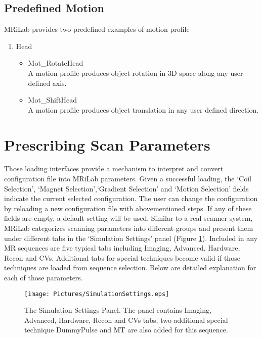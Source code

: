 \documentclass{book}%
\begin{document}
\subsection{Predefined Motion}

MRiLab provides two predefined examples of motion profile

\begin{enumerate}
		\item Head
		\begin{itemize}
			\item Mot\_RotateHead \\
			A motion profile produces object rotation in 3D space along any user defined axis.
			\item Mot\_ShiftHead \\
			A motion profile produces object translation in any user defined direction.
		\end{itemize}
\end{enumerate}

\section{Prescribing Scan Parameters}

Those loading interfaces provide a mechanism to interpret and convert configuration file into MRiLab parameters. Given a successful loading, the `Coil Selection', `Magnet Selection',`Gradient Selection' and `Motion Selection' fields indicate the current selected configuration. The user can change the configuration by reloading a new configuration file with abovementioned steps. If any of these fields are empty, a default setting will be used. Similar to a real scanner system, MRiLab categorizes scanning parameters into different groups and present them under different tabs in the `Simulation Settings' panel (Figure \ref{fig:SimulationSettings}). Included in any MR sequences are five typical tabs including Imaging, Advanced, Hardware, Recon and CVs. Additional tabs for special techniques become valid if those techniques are loaded from sequence selection. Below are detailed explanation for each of those parameters.

\begin{figure}[htbp]
	\centering
		\texttt{[image: Pictures/SimulationSettings.eps]}
	\caption{The Simulation Settings Panel. The panel contains Imaging, Advanced, Hardware, Recon and CVs tabs, two additional special technique DummyPulse and MT are also added for this sequence.}
	\label{fig:SimulationSettings}
\end{figure}
\end{document}
